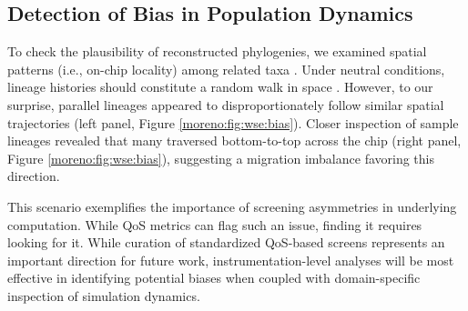 \subsection{Detection of Bias in Population Dynamics}
\label{moreno:sec:case2:bias}

To check the plausibility of reconstructed phylogenies, we examined spatial patterns (i.e., on-chip locality) among related taxa \cite{novembre2008genes,grundler2025geographic}.
Under neutral conditions, lineage histories should constitute a random walk in space \cite{lemey2010phylogeography}.
However, to our surprise, parallel lineages appeared to disproportionately follow similar spatial trajectories (left panel, Figure \ref{moreno:fig:wse:bias}).
Closer inspection of sample lineages revealed that many traversed bottom-to-top across the chip (right panel, Figure \ref{moreno:fig:wse:bias}), suggesting a migration imbalance favoring this direction.

This scenario exemplifies the importance of screening asymmetries in underlying computation.
While QoS metrics can flag such an issue, finding it requires looking for it.
While curation of standardized QoS-based screens represents an important direction for future work, instrumentation-level analyses will be most effective in identifying potential biases when coupled with domain-specific inspection of simulation dynamics.


